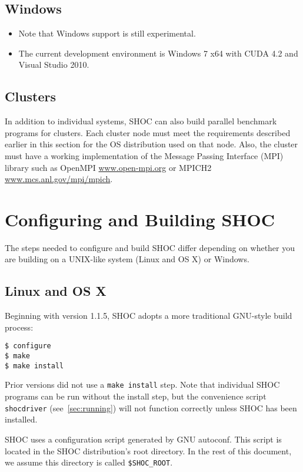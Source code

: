 \documentclass[11pt]{article}
\begin{document}
\subsection{Windows}

\begin{itemize}
\item Note that Windows support is still experimental.
\item The current development environment is Windows 7 x64 with CUDA 4.2 and Visual Studio 2010.
\end{itemize}


\subsection{Clusters}
In addition to individual systems, SHOC can also build parallel benchmark
programs for clusters. Each cluster node must meet the requirements described
earlier in this section for the OS distribution used on that node.
Also, the cluster must have a working implementation of the 
Message Passing Interface 
(MPI)\,\cite{gropp-lusk-skjellum:using-mpi2nd,gropp-lusk-thakur:usingmpi2}
library such as OpenMPI \url{www.open-mpi.org} or MPICH2 
\url{www.mcs.anl.gov/mpi/mpich}.


\section{Configuring and Building SHOC}\label{sec:configuring}

The steps needed to configure and build SHOC differ depending on whether
you are building on a UNIX-like system (Linux and OS X) or Windows.

\subsection{Linux and OS X}\label{sec:conflinux}

Beginning with version 1.1.5, SHOC adopts a more traditional GNU-style
build process:
\begin{Verbatim}[frame=single]
$ configure
$ make
$ make install
\end{Verbatim}
\noindent Prior versions did not use a \verb+make install+ step.
Note that individual SHOC programs can be run without the install step,
but the convenience script \verb+shocdriver+ (see~\ref{sec:running}) will 
not function correctly unless SHOC has been installed.

SHOC uses a configuration script generated by GNU autoconf.  
This script is located in the SHOC distribution's root directory.
In the rest of this document, we assume this directory is called 
\verb+$SHOC_ROOT+.
\end{document}
